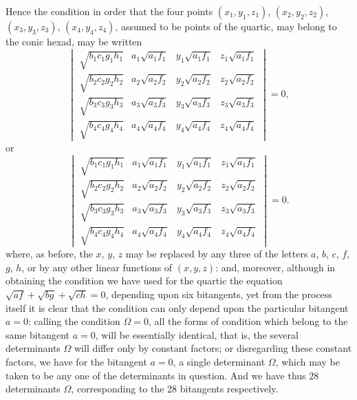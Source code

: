 \documentclass[11pt,a4paper]{article}
\begin{document}
\clearpage
Hence the condition in order that the four points $(x_1, y_1, z_1)$, $(x_2, y_2, z_2)$, $(x_3, y_3, z_3)$, $(x_4, y_4, z_4)$, assumed to be points of the quartic, may belong to the conic hexad, may be written
\[
\begin{vmatrix}
\sqrt{b_1c_1g_1h_1} & a_1\sqrt{a_1f_1} & y_1\sqrt{a_1f_1} & z_1\sqrt{a_1f_1} \\
\sqrt{b_2c_2g_2h_2} & a_2\sqrt{a_2f_2} & y_2\sqrt{a_2f_2} & z_2\sqrt{a_2f_2} \\
\sqrt{b_3c_3g_3h_3} & a_3\sqrt{a_3f_3} & y_3\sqrt{a_3f_3} & z_3\sqrt{a_3f_3} \\
\sqrt{b_4c_4g_4h_4} & a_4\sqrt{a_4f_4} & y_4\sqrt{a_4f_4} & z_4\sqrt{a_4f_4}
\end{vmatrix}
= 0,
\]
or
\[
\begin{vmatrix}
\sqrt{b_1c_1g_1h_1} & a_1\sqrt{a_1f_1} & y_1\sqrt{a_1f_1} & z_1\sqrt{a_1f_1} \\
\sqrt{b_2c_2g_2h_2} & a_2\sqrt{a_2f_2} & y_2\sqrt{a_2f_2} & z_2\sqrt{a_2f_2} \\
\sqrt{b_3c_3g_3h_3} & a_3\sqrt{a_3f_3} & y_3\sqrt{a_3f_3} & z_3\sqrt{a_3f_3} \\
\sqrt{b_4c_4g_4h_4} & a_4\sqrt{a_4f_4} & y_4\sqrt{a_4f_4} & z_4\sqrt{a_4f_4}
\end{vmatrix}
= 0.
\]
where, as before, the $x$, $y$, $z$ may be replaced by any three of the letters $a$, $b$, $c$, $f$, $g$, $h$, or by any other linear functions of $(x, y, z)$: and, moreover, although in obtaining the condition we have used for the quartic the equation $\sqrt{af} + \sqrt{bg} + \sqrt{ch} = 0$, depending upon six bitangents, yet from the process itself it is clear that the condition can only depend upon the particular bitangent $a = 0$: calling the condition $\Omega = 0$, all the forms of condition which belong to the same bitangent $a = 0$, will be essentially identical, that is, the several determinants $\Omega$ will differ only by constant factors; or disregarding these constant factors, we have for the bitangent $a = 0$, a single determinant $\Omega$, which may be taken to be any one of the determinants in question. And we have thus 28 determinants $\Omega$, corresponding to the 28 bitangents respectively.
\end{document}
